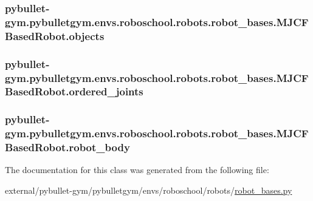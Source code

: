 \subsubsection[{\texorpdfstring{objects}{objects}}]{\setlength{\rightskip}{0pt plus 5cm}pybullet-\/gym.\+pybulletgym.\+envs.\+roboschool.\+robots.\+robot\+\_\+bases.\+M\+J\+C\+F\+Based\+Robot.\+objects}\hypertarget{classpybullet-gym_1_1pybulletgym_1_1envs_1_1roboschool_1_1robots_1_1robot__bases_1_1_m_j_c_f_based_robot_ad577922dc6c623b32621c134d3eca6f1}{}\label{classpybullet-gym_1_1pybulletgym_1_1envs_1_1roboschool_1_1robots_1_1robot__bases_1_1_m_j_c_f_based_robot_ad577922dc6c623b32621c134d3eca6f1}
\subsubsection[{\texorpdfstring{ordered\+\_\+joints}{ordered_joints}}]{\setlength{\rightskip}{0pt plus 5cm}pybullet-\/gym.\+pybulletgym.\+envs.\+roboschool.\+robots.\+robot\+\_\+bases.\+M\+J\+C\+F\+Based\+Robot.\+ordered\+\_\+joints}\hypertarget{classpybullet-gym_1_1pybulletgym_1_1envs_1_1roboschool_1_1robots_1_1robot__bases_1_1_m_j_c_f_based_robot_a23aa21f96973f705d38f4d2cdecb1dba}{}\label{classpybullet-gym_1_1pybulletgym_1_1envs_1_1roboschool_1_1robots_1_1robot__bases_1_1_m_j_c_f_based_robot_a23aa21f96973f705d38f4d2cdecb1dba}
\subsubsection[{\texorpdfstring{robot\+\_\+body}{robot_body}}]{\setlength{\rightskip}{0pt plus 5cm}pybullet-\/gym.\+pybulletgym.\+envs.\+roboschool.\+robots.\+robot\+\_\+bases.\+M\+J\+C\+F\+Based\+Robot.\+robot\+\_\+body}\hypertarget{classpybullet-gym_1_1pybulletgym_1_1envs_1_1roboschool_1_1robots_1_1robot__bases_1_1_m_j_c_f_based_robot_aac85844bda3f8e14a316388a3a4dffeb}{}\label{classpybullet-gym_1_1pybulletgym_1_1envs_1_1roboschool_1_1robots_1_1robot__bases_1_1_m_j_c_f_based_robot_aac85844bda3f8e14a316388a3a4dffeb}


The documentation for this class was generated from the following file\+:\begin{DoxyCompactItemize}
\item 
external/pybullet-\/gym/pybulletgym/envs/roboschool/robots/\hyperlink{roboschool_2robots_2robot__bases_8py}{robot\+\_\+bases.\+py}\end{DoxyCompactItemize}
